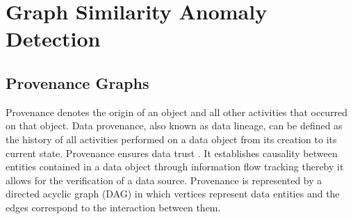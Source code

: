 











%



\section{Graph Similarity Anomaly Detection}


\subsection{Provenance Graphs}

Provenance denotes the origin of an object and all other activities that occurred on that object. Data provenance, also known as data lineage, can be defined as the history of all activities performed on a data object from its creation to its current state. Provenance ensures data trust \cite{Bertino2015}. It establishes causality between entities contained in a data object through information flow tracking thereby it allows for the verification of a data source. Provenance is represented by a directed acyclic graph (DAG) in which vertices represent data entities and the edges correspond to the interaction between them. 

